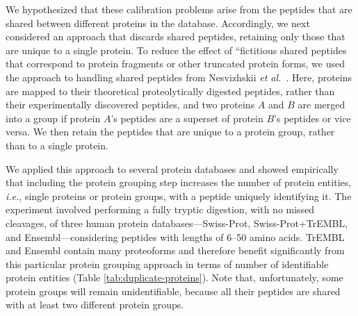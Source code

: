 \documentclass{article}
\begin{document}
We hypothesized that these calibration problems arise from the
peptides that are shared between different proteins in the database.
Accordingly, we next considered an approach that discards shared
peptides, retaining only those that are unique to a single protein.
To reduce the effect of ``fictitious shared peptides that correspond
to protein fragments or other truncated protein forms, we used the
approach to handling shared peptides from Nesvizhskii {\em et
  al.}~\cite{nesvizhskii2003statistical}. Here, proteins are mapped to
their theoretical proteolytically digested peptides, rather than their
experimentally discovered peptides, and two proteins $A$ and $B$ are
merged into a group if protein $A$'s peptides are a superset of
protein $B$'s peptides or vice versa.  We then retain the peptides
that are unique to a protein group, rather than to a single protein.

We applied this approach to several protein databases and showed
empirically that including the protein grouping step increases the
number of protein entities, {\em i.e.}, single proteins or protein
groups, with a peptide uniquely identifying it. The experiment
involved performing a fully tryptic digestion, with no missed
cleavages, of three human protein databases---Swiss-Prot,
Swiss-Prot+TrEMBL, and Ensembl---considering peptides with lengths of
6--50 amino acids. TrEMBL and Ensembl contain many proteoforms and
therefore benefit significantly from this particular protein grouping
approach in terms of number of identifiable protein entities (Table
\ref{tab:duplicate-proteins}). Note that, unfortunately, some protein
groups will remain unidentifiable, because all their peptides are
shared with at least two different protein groups.
\end{document}
